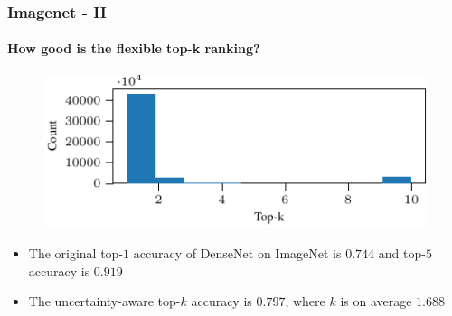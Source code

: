 \documentclass[10pt,usepdftitle=false,aspectratio=169,handout]{beamer}
\begin{document}
\begin{frame}\frametitle{Imagenet - II}
	\framesubtitle{How good is the flexible top-k ranking?}
	\begin{figure}
		\centering
		\includegraphics[width=\figwidth,height=\figheight]{../figures/output-figure4.pdf} 
	\end{figure}
	\begin{itemize}
		\item The original top-$1$ accuracy of DenseNet on ImageNet is $0.744$ and top-$5$ accuracy is $0.919$
		\item The uncertainty-aware top-$k$ accuracy is $0.797$, where $k$ is on average $1.688$
	\end{itemize}
\end{frame}

\end{document}

